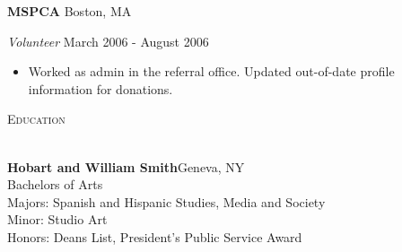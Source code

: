 \documentclass[a4paper]{article}
\newcommand{\lineunder} {
    \vspace*{-8pt} \\
    \hspace*{-18pt} \hrulefill \\
}
\newcommand{\header} [1] {
    {\hspace*{-18pt}\vspace*{6pt} \textsc{#1}}
    \vspace*{-6pt} \lineunder
    \vspace{2mm}
}
\begin{document}
\textbf{\textsc{MSPCA}} \hfill Boston, MA\\
\begin{addmargin}[1em]{0em}
\vspace{2mm}
\textit{Volunteer} \hfill March 2006 - August 2006\\
\vspace{-1mm}
\begin{itemize} \itemsep 1pt
    \item Worked as admin in the referral office. Updated out-of-date profile information 
        for donations.
\end{itemize}
\end{addmargin}
\vspace*{4mm}


\header{\faGraduationCap \hspace{1pt} Education}
\textbf{Hobart and William Smith}\hfill Geneva, NY\\
Bachelors of Arts \\
Majors: Spanish and Hispanic Studies, Media and Society\\
Minor: Studio Art\\
Honors: Deans List, President’s Public Service Award
\vspace{4mm}
\end{document}
